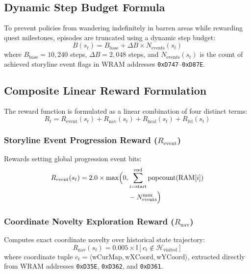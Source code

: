 \documentclass[conference]{IEEEtran}
\begin{document}
\subsection{Dynamic Step Budget Formula}
To prevent policies from wandering indefinitely in barren areas while rewarding quest milestones, episodes are truncated using a dynamic step budget:
\begin{equation}
B(s_t) = B_{\text{base}} + \Delta B \times N_{\text{events}}(s_t)
\end{equation}
where $B_{\text{base}} = 10{,}240$ steps, $\Delta B = 2{,}048$ steps, and $N_{\text{events}}(s_t)$ is the count of achieved storyline event flags in WRAM addresses \texttt{0xD747}--\texttt{0xD87E}.

\subsection{Composite Linear Reward Formulation}
The reward function is formulated as a linear combination of four distinct terms:
\begin{equation}
R_t = R_{\text{event}}(s_t) + R_{\text{nav}}(s_t) + R_{\text{heal}}(s_t) + R_{\text{lvl}}(s_t)
\end{equation}

\subsubsection{Storyline Event Progression Reward \texorpdfstring{($R_{\text{event}}$)}{(R\_event)}}
Rewards setting global progression event bits:
\begin{align}
R_{\text{event}}(s_t) = 2.0 \times \max\Bigl(0, &\sum_{i=\text{start}}^{\text{end}} \text{popcount}(\text{RAM}[i]) \nonumber \\
&- N_{\text{events}}^{\max}\Bigr)
\end{align}

\subsubsection{Coordinate Novelty Exploration Reward \texorpdfstring{($R_{\text{nav}}$)}{(R\_nav)}}
Computes exact coordinate novelty over historical state trajectory:
\begin{equation}
R_{\text{nav}}(s_t) = 0.005 \times \mathbb{I}[c_t \notin \mathcal{H}_{\text{visited}}]
\end{equation}
where coordinate tuple $c_t = \langle \text{wCurMap}, \text{wXCoord}, \text{wYCoord} \rangle$, extracted directly from WRAM addresses \texttt{0xD35E}, \texttt{0xD362}, and \texttt{0xD361}.
\end{document}
